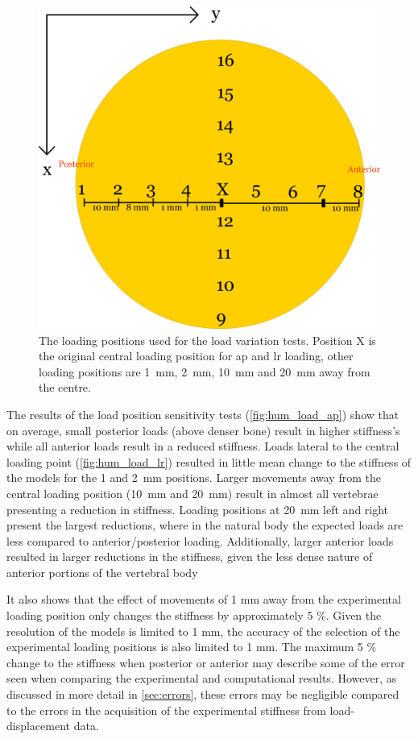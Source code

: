 \begin{figure}[ht!]
\centering
\includegraphics[width=.7\textwidth]{Chapters/Chapter_HT_images/Loading_positions_Human.png}
\caption{The loading positions used for the load variation tests. Position X is
the original central loading position for ap and lr loading, other loading
positions are 1~mm, 2~mm, 10~mm and 20~mm away from the centre.}
\label{fig:loading_pos}
\end{figure}


The results of the load position sensitivity tests (\cref{fig:hum_load_ap})
show that on average, small posterior loads (above denser bone) result in
higher stiffness's while all anterior loads result in a reduced stiffness.
Loads lateral to the central loading point (\cref{fig:hum_load_lr}) resulted in
little mean change to the stiffness of the models for the 1 and 2~mm
positions.
Larger movements away from the central loading position (10~mm and 20~mm)
result in almost all vertebrae presenting a reduction in stiffness.
Loading positions at 20~mm left and right present the largest reductions, where
in the natural body the expected loads are less compared to anterior/posterior
loading.
Additionally, larger anterior loads resulted in larger reductions in the
stiffness, given the less dense nature of anterior portions of the vertebral
body

It also shows that the effect of movements of 1 mm away from the experimental
loading position only changes the stiffness by approximately 5 \%.
Given the resolution of the models is limited to 1 mm, the accuracy of the
selection of the experimental loading positions is also limited to 1 mm.
The maximum 5 \% change to the stiffness when posterior or anterior may
describe some of the error seen when comparing the experimental and
computational results. However, as discussed in more detail in \cref{sec:errors}, these errors may be negligible compared to the errors in the acquisition of the experimental stiffness from load-displacement data.

